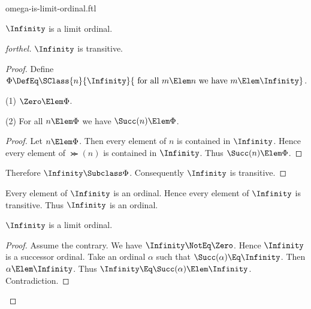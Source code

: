 \documentclass{stex}
\begin{document}
\begin{smodule}{omega-is-limit-ordinal.ftl}


\begin{proposition*}[forthel]
  $\Infinity$ is a limit ordinal.
\end{proposition*}
\begin{proof}[forthel]
  $\Infinity$ is transitive.
  \begin{proof}
    Define $\Phi \DefEq \SClass{n}{\Infinity}{\text{ for all }m \Elem n\text{ we have }m \Elem \Infinity}$.

    (1) $\Zero \Elem \Phi$.

    (2) For all $n \Elem \Phi$ we have $\Succ(n) \Elem \Phi$.
    \begin{proof}
      Let $n \Elem \Phi$.
      Then every element of $n$ is contained in $\Infinity$.
      Hence every element of $\Succ(n)$ is contained in $\Infinity$.
      Thus $\Succ(n) \Elem \Phi$.
    \end{proof}

    Therefore $\Infinity \Subclass \Phi$.
    Consequently $\Infinity$ is transitive.
  \end{proof}

  Every element of $\Infinity$ is an ordinal.
  Hence every element of $\Infinity$ is transitive.
  Thus $\Infinity$ is an ordinal.

  $\Infinity$ is a limit ordinal.
  \begin{proof}
    Assume the contrary.
    We have $\Infinity \NotEq \Zero$.
    Hence $\Infinity$ is a successor ordinal.
    Take an ordinal $\alpha$ such that $\Succ(\alpha) \Eq \Infinity$.
    Then $\alpha \Elem \Infinity$.
    Thus $\Infinity \Eq \Succ(\alpha) \Elem \Infinity$.
    Contradiction.
  \end{proof}
\end{proof}

\end{smodule}
\end{document}
